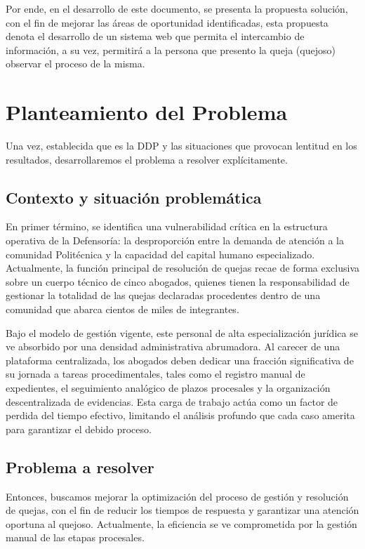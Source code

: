 \begin{flushleft}
Por ende, en el desarrollo de este documento, se presenta la propuesta solución, con el fin de mejorar las áreas de oportunidad identificadas, esta propuesta denota el desarrollo de un sistema web que permita el intercambio de información, a su vez, permitirá a la persona que presento la queja (quejoso) observar el proceso de la misma.

\section{Planteamiento del Problema}
\end{flushleft}
\justifying
Una vez, establecida que es la DDP y las situaciones que provocan lentitud en los resultados, desarrollaremos el problema a resolver explícitamente.

\subsection{Contexto y situación problemática}
En primer término, se identifica una vulnerabilidad crítica en la estructura operativa de la Defensoría: la desproporción entre la demanda de atención a la comunidad Politécnica y la capacidad del capital humano especializado. Actualmente, la función principal de resolución de quejas recae de forma exclusiva sobre un cuerpo técnico de cinco abogados, quienes tienen la responsabilidad de gestionar la totalidad de las quejas declaradas procedentes dentro de una comunidad que abarca cientos de miles de integrantes.

Bajo el modelo de gestión vigente, este personal de alta especialización jurídica se ve absorbido por una densidad administrativa abrumadora. Al carecer de una plataforma centralizada, los abogados deben dedicar una fracción significativa de su jornada a tareas procedimentales, tales como el registro manual de expedientes, el seguimiento analógico de plazos procesales y la organización descentralizada de evidencias. Esta carga de trabajo actúa como un factor de perdida del tiempo efectivo, limitando el análisis profundo que cada caso amerita para garantizar el debido proceso.

\subsection{Problema a resolver}
Entonces, buscamos mejorar la optimización del proceso de gestión y resolución de quejas, con el fin de reducir los tiempos de respuesta y garantizar una atención oportuna al quejoso. Actualmente, la eficiencia se ve comprometida por la gestión manual de las etapas procesales.

